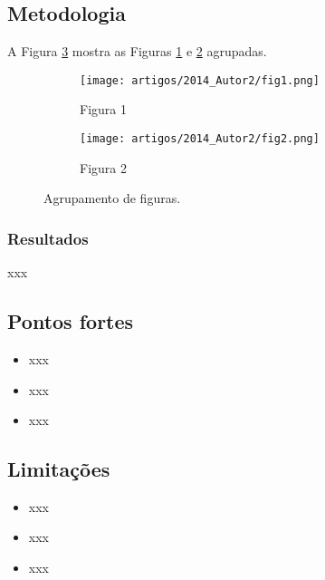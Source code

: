 \subsection{Metodologia}

A Figura \ref{fig:2014:Autor2:figs} mostra as Figuras \ref{fig:2014:Autor2:fig1}
e \ref{fig:2014:Autor2:fig2} agrupadas.

\begin{figure}[ht]
	\centering
	\begin{subfigure}[t]{0.48\textwidth}
		\centering
		\texttt{[image: artigos/2014\_Autor2/fig1.png]}
		\caption{Figura 1}
		\label{fig:2014:Autor2:fig1}
	\end{subfigure}
 	\begin{subfigure}[t]{0.48\textwidth}
		\centering
		\texttt{[image: artigos/2014\_Autor2/fig2.png]}
		\caption{Figura 2}
		\label{fig:2014:Autor2:fig2}
	\end{subfigure}
	\caption{Agrupamento de figuras.}
	\label{fig:2014:Autor2:figs}
\end{figure}

\subsubsection{Resultados}
xxx

\subsection{Pontos fortes} %
\begin{itemize}
  \item xxx
  \item xxx
  \item xxx
\end{itemize}  

\subsection{Limitações} %
\begin{itemize}
  \item xxx
  \item xxx
  \item xxx
\end{itemize} 


